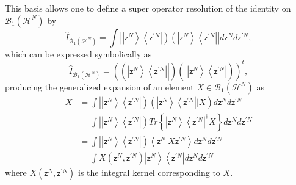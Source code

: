 \documentclass[aps,preprint]{revtex4}%
\begin{document}
This basis allows one to define a super operator resolution of the identity on
$\mathcal{B}_{1}\left(  \mathcal{H}^{N}\right)  $ by
\begin{equation}
\hat{I}_{\mathcal{B}_{1}\left(  \mathcal{H}^{N}\right)  }=%
{\displaystyle\int}
\left\vert \left\vert \mathsf{z}^{N}\right\rangle \left\langle \mathsf{z}%
^{\prime N}\right\vert \right)  \left(  \left\vert \mathsf{z}^{N}\right\rangle
\left\langle \mathsf{z}^{\prime N}\right\vert \right\vert d\mathsf{z}%
^{N}d\mathsf{z}^{\prime N},
\end{equation}
which can be expressed symbolically as
\begin{equation}
\hat{I}_{\mathcal{B}_{1}\left(  \mathcal{H}^{N}\right)  }=\left(  \left(
\underline{\left\vert \mathsf{z}^{N}\right\rangle \left\langle \mathsf{z}%
^{\prime N}\right\vert }\right\vert \right)  \left(  \left\vert \underline
{\left\vert \mathsf{z}^{N}\right\rangle \left\langle \mathsf{z}^{\prime
N}\right\vert }\right)  \right)  ^{t},
\end{equation}
producing the generalized expansion of an element $X\in\mathcal{B}_{1}\left(
\mathcal{H}^{N}\right)  $ as%
\begin{align}
X  &  =%
{\displaystyle\int}
\left\vert \left\vert \mathsf{z}^{N}\right\rangle \left\langle \mathsf{z}%
^{\prime N}\right\vert \right)  \left(  \left\vert \mathsf{z}^{N}\right\rangle
\left\langle \mathsf{z}^{\prime N}\right\vert |X\right)  d\mathsf{z}%
^{N}d\mathsf{z}^{\prime N}\nonumber\\
&  =%
{\displaystyle\int}
\left\vert \left\vert \mathsf{z}^{N}\right\rangle \left\langle \mathsf{z}%
^{\prime N}\right\vert \right)  Tr\left\{  \left\vert \mathsf{z}%
^{N}\right\rangle \left\langle \mathsf{z}^{\prime N}\right\vert ^{\dagger
}X\right\}  d\mathsf{z}^{N}d\mathsf{z}^{\prime N}\nonumber\\
&  =%
{\displaystyle\int}
\left\vert \left\vert \mathsf{z}^{N}\right\rangle \left\langle \mathsf{z}%
^{\prime N}\right\vert \right)  \left\langle \mathsf{z}^{N}|X\mathsf{z}%
^{\prime N}\right\rangle d\mathsf{z}^{N}d\mathsf{z}^{\prime N}\nonumber\\
&  =%
{\displaystyle\int}
X\left(  \mathsf{z}^{N},\mathsf{z}^{\prime N}\right)  \left\vert
\mathsf{z}^{N}\right\rangle \left\langle \mathsf{z}^{\prime N}\right\vert
d\mathsf{z}^{N}d\mathsf{z}^{\prime N}%
\end{align}
where $X\left(  \mathsf{z}^{N},\mathsf{z}^{\prime N}\right)  $ is the integral
kernel corresponding to $X$.
\end{document}
